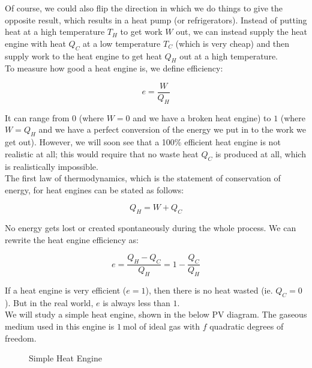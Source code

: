 Of course, we could also flip the direction in which we do things to give the opposite result, which results in a heat pump (or refrigerators). Instead of putting heat at a high temperature $T_H$ to get work $W$ out, we can instead supply the heat engine with heat $Q_C$ at a low temperature $T_C$ (which is very cheap) and then supply work to the heat engine to get heat $Q_H$ out at a high temperature. \\

To measure how good a heat engine is, we define efficiency:

\[e=\frac{W}{Q_H}\]

It can range from $0$ (where $W=0$ and we have a broken heat engine) to $1$ (where $W=Q_H$ and we have a perfect conversion of the energy we put in to the work we get out). However, we will soon see that a 100\% efficient heat engine is not realistic at all; this would require that no waste heat $Q_C$ is produced at all, which is realistically impossible. \\

The first law of thermodynamics, which is the statement of conservation of energy, for heat engines can be stated as follows:

\[Q_H=W+Q_C\]

No energy gets lost or created spontaneously during the whole process. We can rewrite the heat engine efficiency as:

\[e=\frac{Q_H-Q_C}{Q_H}=1-\frac{Q_C}{Q_H}\]

If a heat engine is very efficient ($e=1$), then there is no heat wasted (ie. $Q_C=0$). But in the real world, $e$ is always less than $1$. \\

We will study a simple heat engine, shown in the below PV diagram. The gaseous medium used in this engine is $\SI{1}{\mole}$ of ideal gas with $f$ quadratic degrees of freedom.

\begin{figure}[H]
	\centering
	\caption{Simple Heat Engine}
\end{figure}


